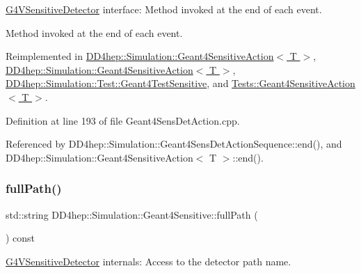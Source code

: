\hyperlink{class_g4_v_sensitive_detector}{G4\+V\+Sensitive\+Detector} interface\+: Method invoked at the end of each event. 

Method invoked at the end of each event. 

Reimplemented in \hyperlink{class_d_d4hep_1_1_simulation_1_1_geant4_sensitive_action_a144120acdde58a966bd627c572ca191d}{D\+D4hep\+::\+Simulation\+::\+Geant4\+Sensitive\+Action$<$ T $>$}, \hyperlink{class_d_d4hep_1_1_simulation_1_1_geant4_sensitive_action_a9847064b0c71d72bc079dcc4ff00b64f}{D\+D4hep\+::\+Simulation\+::\+Geant4\+Sensitive\+Action$<$ T $>$}, \hyperlink{class_d_d4hep_1_1_simulation_1_1_test_1_1_geant4_test_sensitive_accc5a2ae9369d9847ac25a01b55e6350}{D\+D4hep\+::\+Simulation\+::\+Test\+::\+Geant4\+Test\+Sensitive}, and \hyperlink{class_tests_1_1_geant4_sensitive_action_aeeb492550f054b8dd9f4780601fc1d66}{Tests\+::\+Geant4\+Sensitive\+Action$<$ T $>$}.



Definition at line 193 of file Geant4\+Sens\+Det\+Action.\+cpp.



Referenced by D\+D4hep\+::\+Simulation\+::\+Geant4\+Sens\+Det\+Action\+Sequence\+::end(), and D\+D4hep\+::\+Simulation\+::\+Geant4\+Sensitive\+Action$<$ T $>$\+::end().

\hypertarget{class_d_d4hep_1_1_simulation_1_1_geant4_sensitive_a327dcac774eca3a0caf8d45cb1a0d322}{}\label{class_d_d4hep_1_1_simulation_1_1_geant4_sensitive_a327dcac774eca3a0caf8d45cb1a0d322} 
\subsubsection{\texorpdfstring{full\+Path()}{fullPath()}}
{\footnotesize\ttfamily std\+::string D\+D4hep\+::\+Simulation\+::\+Geant4\+Sensitive\+::full\+Path (\begin{DoxyParamCaption}{ }\end{DoxyParamCaption}) const\hspace{0.3cm}{\ttfamily [inline]}}



\hyperlink{class_g4_v_sensitive_detector}{G4\+V\+Sensitive\+Detector} internals\+: Access to the detector path name. 



